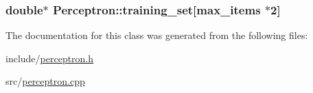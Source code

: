 \subsubsection[{training\+\_\+set}]{\setlength{\rightskip}{0pt plus 5cm}double$\ast$ Perceptron\+::training\+\_\+set\mbox{[}{\bf max\+\_\+items} $\ast$2\mbox{]}}\hypertarget{classPerceptron_af93816c52b31be423764b53c22733a01}{}\label{classPerceptron_af93816c52b31be423764b53c22733a01}


The documentation for this class was generated from the following files\+:\begin{DoxyCompactItemize}
\item 
include/\hyperlink{perceptron_8h}{perceptron.\+h}\item 
src/\hyperlink{perceptron_8cpp}{perceptron.\+cpp}\end{DoxyCompactItemize}
